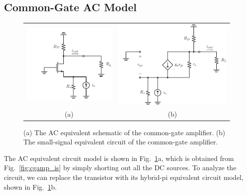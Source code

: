 \subsection{Common-Gate AC Model}
\begin{figure}[tb]
\centering
\begin{tabular}{cc}
\includegraphics[scale=.85]{cgamp_is_ac} &
\includegraphics[scale=.85]{cgamp_is_ac_ss}\\
(a) & (b)\\
\end{tabular}
\caption{(a) The AC equivalent schematic of the common-gate amplifier.  (b) The small-signal equivalent circuit of the common-gate amplifier.}
\label{fig:cgamp_is_ac}
\end{figure}
The AC equivalent circuit model is shown in Fig.~\ref{fig:cgamp_is_ac}a, which is obtained from Fig.~\ref{fig:cgamp_is} by simply shorting out all the DC sources.  To analyze the circuit, we can replace the transistor with its hybrid-pi equivalent circuit model, shown in Fig.~\ref{fig:cgamp_is_ac}b.
